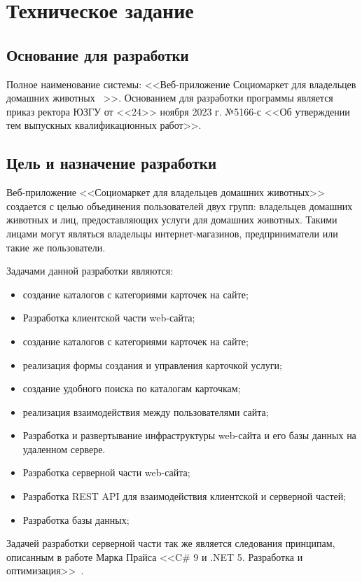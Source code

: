 \section{Техническое задание}
\subsection{Основание для разработки}

Полное наименование системы: <<Веб-приложение \textquotedbl Социомаркет для владельцев домашних животных \textquotedbl\ >>.
Основанием для разработки программы является приказ ректора ЮЗГУ от <<24>> ноября 2023 г. №5166-с <<Об утверждении тем выпускных квалификационных работ>>.

\subsection{Цель и назначение разработки}

Веб-приложение <<Социомаркет для владельцев домашних животных>> создается с целью объединения пользователей двух групп: владельцев домашних животных и лиц, предоставляющих услуги для домашних животных. Такими лицами могут являться владельцы интернет-магазинов, предприниматели или такие же пользователи.

Задачами данной разработки являются:
\begin{itemize}
\item создание каталогов с категориями карточек на сайте;
\item Разработка клиентской части web-сайта;
\item    создание каталогов с категориями карточек на сайте;
\item    реализация формы создания и управления карточкой услуги;
\item    создание удобного поиска по каталогам карточкам;
\item    реализация взаимодействия между пользователями сайта;
\item    Разработка и развертывание инфраструктуры web-сайта и его базы данных на удаленном сервере.
\item Разработка серверной части web-сайта;
\item    Разработка REST API для взаимодействия клиентской и серверной частей;
\item    Разработка базы данных;
\end{itemize}

Задачей разработки серверной части так же является следования принципам, описанным в работе Марка Прайса <<C\# 9 и .NET 5. Разработка и оптимизация>>~\cite{mark_price}.

